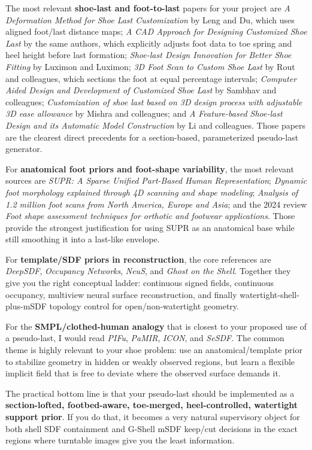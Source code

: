 \documentclass[
  10.5pt,
]{article}
\begin{document}
The most relevant \textbf{shoe-last and foot-to-last} papers for your
project are \emph{A Deformation Method for Shoe Last Customization} by
Leng and Du, which uses aligned foot/last distance maps; \emph{A CAD
Approach for Designing Customized Shoe Last} by the same authors, which
explicitly adjusts foot data to toe spring and heel height before last
formation; \emph{Shoe-last Design Innovation for Better Shoe Fitting} by
Luximon and Luximon; \emph{3D Foot Scan to Custom Shoe Last} by Rout and
colleagues, which sections the foot at equal percentage intervals;
\emph{Computer Aided Design and Development of Customized Shoe Last} by
Sambhav and colleagues; \emph{Customization of shoe last based on 3D
design process with adjustable 3D ease allowance} by Mishra and
colleagues; and \emph{A Feature-based Shoe-last Design and its Automatic
Model Construction} by Li and colleagues. Those papers are the clearest
direct precedents for a section-based, parameterized pseudo-last
generator.

For \textbf{anatomical foot priors and foot-shape variability}, the most
relevant sources are \emph{SUPR: A Sparse Unified Part-Based Human
Representation}; \emph{Dynamic foot morphology explained through 4D
scanning and shape modeling}; \emph{Analysis of 1.2 million foot scans
from North America, Europe and Asia}; and the 2024 review \emph{Foot
shape assessment techniques for orthotic and footwear applications}.
Those provide the strongest justification for using SUPR as an
anatomical base while still smoothing it into a last-like envelope.

For \textbf{template/SDF priors in reconstruction}, the core references
are \emph{DeepSDF}, \emph{Occupancy Networks}, \emph{NeuS}, and
\emph{Ghost on the Shell}. Together they give you the right conceptual
ladder: continuous signed fields, continuous occupancy, multiview neural
surface reconstruction, and finally watertight-shell-plus-mSDF topology
control for open/non-watertight geometry.

For the \textbf{SMPL/clothed-human analogy} that is closest to your
proposed use of a pseudo-last, I would read \emph{PIFu}, \emph{PaMIR},
\emph{ICON}, and \emph{SeSDF}. The common theme is highly relevant to
your shoe problem: use an anatomical/template prior to stabilize
geometry in hidden or weakly observed regions, but learn a flexible
implicit field that is free to deviate where the observed surface
demands it.

The practical bottom line is that your pseudo-last should be implemented
as a \textbf{section-lofted, footbed-aware, toe-merged, heel-controlled,
watertight support prior}. If you do that, it becomes a very natural
supervisory object for both shell SDF containment and G-Shell mSDF
keep/cut decisions in the exact regions where turntable images give you
the least information.
\end{document}
